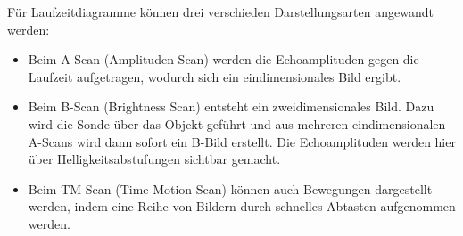 Für Laufzeitdiagramme können drei verschieden Darstellungsarten angewandt werden:

\begin{itemize}
  \item Beim A-Scan (Amplituden Scan) werden die Echoamplituden gegen die Laufzeit aufgetragen, wodurch sich ein eindimensionales Bild ergibt.
  \item Beim B-Scan (Brightness Scan) entsteht ein zweidimensionales Bild. Dazu wird die Sonde über das Objekt geführt und aus mehreren eindimensionalen A-Scans wird dann sofort ein B-Bild erstellt. Die Echoamplituden werden hier 
  über Helligkeitsabstufungen sichtbar gemacht.
  \item Beim TM-Scan (Time-Motion-Scan) können auch Bewegungen dargestellt werden, indem eine Reihe von Bildern durch schnelles Abtasten aufgenommen werden.
\end{itemize}